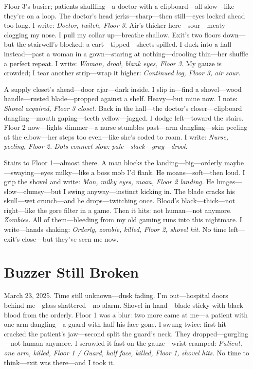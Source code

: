 \documentclass{article}
\begin{document}
Floor 3’s busier; patients shuffling—a doctor with a clipboard—all slow—like they’re on a loop. The doctor’s head jerks—sharp—then still—eyes locked ahead too long. I write: \textit{Doctor, twitch, Floor 3.} Air’s thicker here—sour—meaty—clogging my nose. I pull my collar up—breathe shallow. Exit’s two floors down—but the stairwell’s blocked: a cart—tipped—sheets spilled. I duck into a hall instead—past a woman in a gown—staring at nothing—drooling thin—her shuffle a perfect repeat. I write: \textit{Woman, drool, blank eyes, Floor 3.} My gauze is crowded; I tear another strip—wrap it higher: \textit{Continued log, Floor 3, air sour.}

A supply closet’s ahead—door ajar—dark inside. I slip in—find a shovel—wood handle—rusted blade—propped against a shelf. Heavy—but mine now. I note: \textit{Shovel acquired, Floor 3 closet.} Back in the hall—the doctor’s closer—clipboard dangling—mouth gaping—teeth yellow—jagged. I dodge left—toward the stairs. Floor 2 now—lights dimmer—a nurse stumbles past—arm dangling—skin peeling at the elbow—her steps too even—like she’s coded to roam. I write: \textit{Nurse, peeling, Floor 2.} \textit{Dots connect slow: pale—slack—gray—drool.}

Stairs to Floor 1—almost there. A man blocks the landing—big—orderly maybe—swaying—eyes milky—like a boss mob I’d flank. He moans—soft—then loud. I grip the shovel and write: \textit{Man, milky eyes, moan, Floor 2 landing.} He lunges—slow—clumsy—but I swing anyway—instinct kicking in. The blade cracks his skull—wet crunch—and he drops—twitching once. Blood’s black—thick—not right—like the gore filter in a game. Then it hits: not human—not anymore. \textit{Zombies.} All of them—bleeding from my old gaming runs into this nightmare. I write—hands shaking: \textit{Orderly, zombie, killed, Floor 2, shovel hit.} No time left—exit’s close—but they’ve seen me now.

\section*{Buzzer Still Broken}

March 23, 2025. Time still unknown—dusk fading. I’m out—hospital doors behind me—glass shattered—no alarm. Shovel in hand—blade sticky with black blood from the orderly. Floor 1 was a blur: two more came at me—a patient with one arm dangling—a guard with half his face gone. I swung twice: first hit cracked the patient’s jaw—second split the guard’s neck. They dropped—gurgling—not human anymore. I scrawled it fast on the gauze—wrist cramped: \textit{Patient, one arm, killed, Floor 1 / Guard, half face, killed, Floor 1, shovel hits.} No time to think—exit was there—and I took it.
\end{document}
